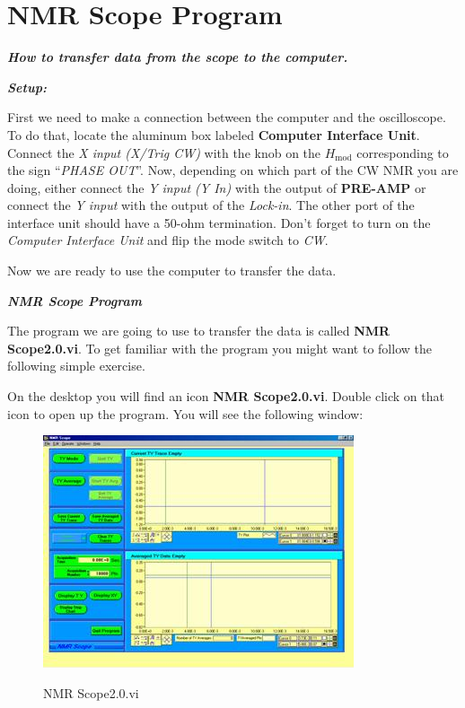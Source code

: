 \documentclass{../lab}
\begin{document}
\section{NMR Scope Program}

\emph{\textbf{How to transfer data from the scope to the computer.}}

\emph{\textbf{Setup:}}

First we need to make a connection between the computer and the oscilloscope. To do that, locate the aluminum box labeled \textbf{Computer Interface Unit}. Connect the \emph{X input (X/Trig CW)} with the knob on the $H_\text{mod}$ corresponding to the sign ``\emph{PHASE OUT}''. Now, depending on which part of the CW NMR you are doing, either connect the \emph{Y input (Y In)} with the output of \textbf{PRE-AMP} or connect the \emph{Y input} with the output of the \emph{Lock-in}. The other port of the interface unit should have a 50-ohm termination. Don't forget to turn on the \emph{Computer Interface Unit} and flip the mode switch to \emph{CW}.

Now we are ready to use the computer to transfer the data.

\emph{\textbf{NMR Scope Program}}

The program we are going to use to transfer the data is called \textbf{NMR Scope2.0.vi}. To get familiar with the program you might want to follow the following simple exercise.

On the desktop you will find an icon \textbf{NMR Scope2.0.vi}. Double click on that icon to open up the program. You will see the following window:

\begin{figure}[h]
    \centering
    \href{http://experimentationlab.berkeley.edu/sites/default/files/images/NMR35.jpg}{\includegraphics[width=0.5\linewidth]{images/NMR35.jpg}}
    \caption{NMR Scope2.0.vi}
    \label{fig:NMR35}
\end{figure}

\newpage
\end{document}
